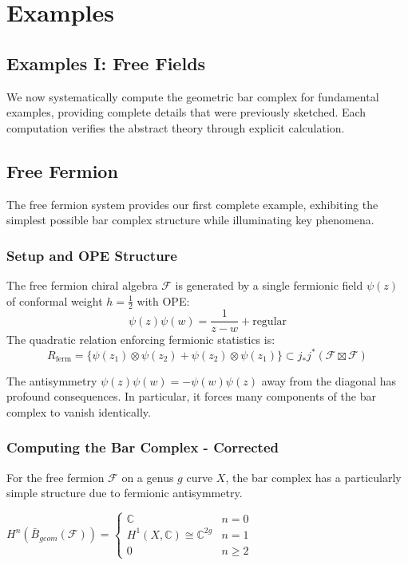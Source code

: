 
\chapter{Examples}
\section{Examples I: Free Fields}
 
We now systematically compute the geometric bar complex for fundamental examples, providing complete 
details that were previously sketched. Each computation verifies the abstract theory through explicit 
calculation.
 
\section{Free Fermion}
 
The free fermion system provides our first complete example, exhibiting the simplest possible bar complex 
structure while illuminating key phenomena.
 
\subsection{Setup and OPE Structure}
 
\begin{definition}
The free fermion chiral algebra $\mathcal{F}$ is generated by a single fermionic field $\psi(z)$ of 
conformal weight $h = \frac{1}{2}$ with OPE:
\[
\psi(z)\psi(w) = \frac{1}{z-w} + \text{regular}
\]
The quadratic relation enforcing fermionic statistics is:
\[
R_{\text{ferm}} = \{\psi(z_1) \otimes \psi(z_2) + \psi(z_2) \otimes \psi(z_1)\} \subset 
j_*j^*(\mathcal{F} \boxtimes \mathcal{F})
\]
\end{definition}
 
\begin{remark}
The antisymmetry $\psi(z)\psi(w) = -\psi(w)\psi(z)$ away from the diagonal has profound consequences. 
In particular, it forces many components of the bar complex to vanish identically.
\end{remark}
 
\subsection{Computing the Bar Complex - Corrected}

\begin{theorem}
For the free fermion $\mathcal{F}$ on a genus $g$ curve $X$, the bar complex has a particularly simple structure due to fermionic antisymmetry.


$H^n(\bar{B}_{geom}(\mathcal{F})) = \begin{cases}
\mathbb{C} & n = 0\\
H^1(X, \mathbb{C}) \cong \mathbb{C}^{2g} & n = 1\\
0 & n \geq 2
\end{cases}$
\end{theorem}

